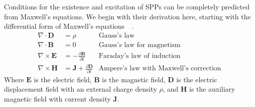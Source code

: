 Conditions for the existence and excitation of SPPs can be completely
predicted from Maxwell's equations.  We begin with their derivation here,
starting with the differential form of Maxwell's
equations~\cite{maier2007plasmonics}~\cite{benson2009elements}.
\begin{align}
\nabla \cdot \mathbf{D} &= \rho & \text{Gauss's law} \label{eqn:gausslaw}\\
\nabla \cdot \mathbf{B} &= 0 & \text{Gauss's law for magnetism} \label{eqn:gausslawmagnetism}\\
\nabla \times \mathbf{E} &= -\frac{\partial \mathbf{B}} {\partial t}
& \text{Faraday's law of induction} \label{eqn:faradayslaw} \\
\nabla \times \mathbf{H} &= \mathbf{J} + \frac{\partial \mathbf{D}} {\partial
t}  & \text{Ampere's law with Maxwell's correction}
\label{eqn:ampereslaw}
\end{align}
Where $\mathbf{E}$ is the electric field, $\mathbf{B}$ is the magnetic
field, $\mathbf{D}$ is the electric displacement field with an external
charge density $\rho$, and $\mathbf{H}$ is the auxiliary magnetic field
with current density $\mathbf{J}$.

